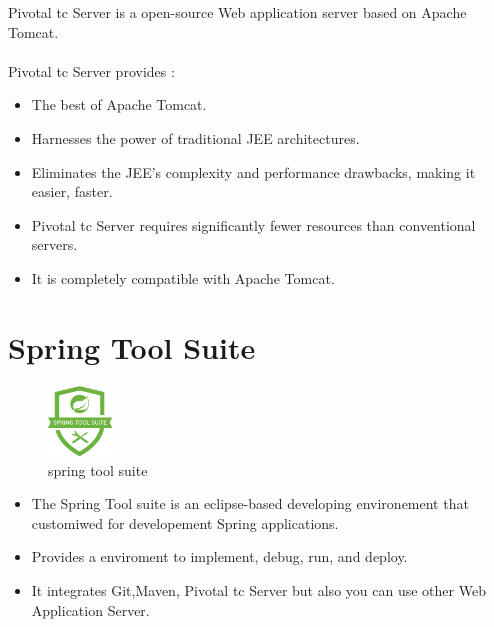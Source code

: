 \documentclass[12pt]{article}
\begin{document}
Pivotal tc Server is a open-source Web application server based on Apache Tomcat.
\\
\\
Pivotal tc Server provides :
\begin{itemize}
	\item The best of Apache Tomcat.
	\item Harnesses the power of traditional JEE architectures.
	\item Eliminates the JEE's complexity and performance drawbacks, making it easier, faster.
	\item Pivotal tc Server requires significantly fewer resources than conventional servers.
	\item It is completely compatible with Apache Tomcat.
\end{itemize}

\clearpage
\newpage

\section{Spring Tool Suite}

\begin{figure}[h]
	
	\centering
	\includegraphics[width=0.15\textwidth]{spring-tool-suite-project-logo.png}
	\caption{spring tool suite}
	\label{spring tool suite}
\end{figure}
\begin{itemize}
	\item The Spring Tool suite is an eclipse-based developing environement that customiwed for developement  Spring applications.
	\item Provides a enviroment to implement, debug, run, and deploy.
	\item It integrates Git,Maven, Pivotal tc Server but also you can use other Web Application Server. 
\end{itemize}

\clearpage
\newpage
\end{document}
